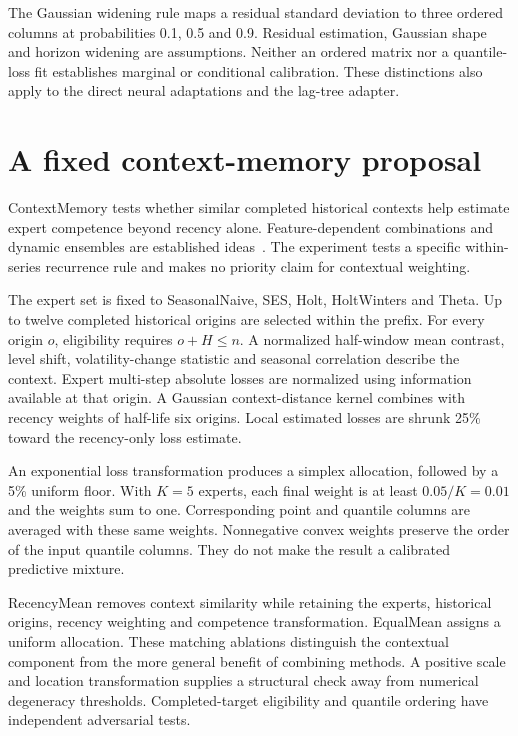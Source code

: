 \documentclass[11pt,a4paper]{article}
\begin{document}
The Gaussian widening rule maps a residual standard deviation to three ordered columns at probabilities 0.1, 0.5 and 0.9. Residual estimation, Gaussian shape and horizon widening are assumptions. Neither an ordered matrix nor a quantile-loss fit establishes marginal or conditional calibration. These distinctions also apply to the direct neural adaptations and the lag-tree adapter.







\section{A fixed context-memory proposal}
\label{sec:method-combinations}
ContextMemory tests whether similar completed historical contexts help estimate expert competence beyond recency alone. Feature-dependent combinations and dynamic ensembles are established ideas~\cite{fforma,ade}. The experiment tests a specific within-series recurrence rule and makes no priority claim for contextual weighting.

The expert set is fixed to SeasonalNaive, SES, Holt, HoltWinters and Theta. Up to twelve completed historical origins are selected within the prefix. For every origin $o$, eligibility requires $o+H\leq n$. A normalized half-window mean contrast, level shift, volatility-change statistic and seasonal correlation describe the context. Expert multi-step absolute losses are normalized using information available at that origin. A Gaussian context-distance kernel combines with recency weights of half-life six origins. Local estimated losses are shrunk 25\% toward the recency-only loss estimate.

An exponential loss transformation produces a simplex allocation, followed by a 5\% uniform floor. With $K=5$ experts, each final weight is at least $0.05/K=0.01$ and the weights sum to one. Corresponding point and quantile columns are averaged with these same weights. Nonnegative convex weights preserve the order of the input quantile columns. They do not make the result a calibrated predictive mixture.

RecencyMean removes context similarity while retaining the experts, historical origins, recency weighting and competence transformation. EqualMean assigns a uniform allocation. These matching ablations distinguish the contextual component from the more general benefit of combining methods. A positive scale and location transformation supplies a structural check away from numerical degeneracy thresholds. Completed-target eligibility and quantile ordering have independent adversarial tests.
\end{document}
